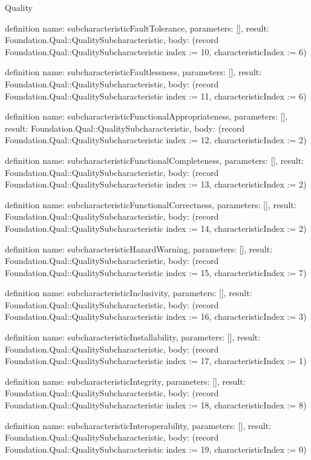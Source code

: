 \begin{lexlean}{Quality}
\begin{semanticmodule}
definition{
  name: subcharacteristicFaultTolerance,
  parameters: [],
  result: Foundation.Qual::QualitySubcharacteristic,
  body: (record Foundation.Qual::QualitySubcharacteristic {index := 10, characteristicIndex := 6})
}

definition{
  name: subcharacteristicFaultlessness,
  parameters: [],
  result: Foundation.Qual::QualitySubcharacteristic,
  body: (record Foundation.Qual::QualitySubcharacteristic {index := 11, characteristicIndex := 6})
}

definition{
  name: subcharacteristicFunctionalAppropriateness,
  parameters: [],
  result: Foundation.Qual::QualitySubcharacteristic,
  body: (record Foundation.Qual::QualitySubcharacteristic {index := 12, characteristicIndex := 2})
}

definition{
  name: subcharacteristicFunctionalCompleteness,
  parameters: [],
  result: Foundation.Qual::QualitySubcharacteristic,
  body: (record Foundation.Qual::QualitySubcharacteristic {index := 13, characteristicIndex := 2})
}

definition{
  name: subcharacteristicFunctionalCorrectness,
  parameters: [],
  result: Foundation.Qual::QualitySubcharacteristic,
  body: (record Foundation.Qual::QualitySubcharacteristic {index := 14, characteristicIndex := 2})
}

definition{
  name: subcharacteristicHazardWarning,
  parameters: [],
  result: Foundation.Qual::QualitySubcharacteristic,
  body: (record Foundation.Qual::QualitySubcharacteristic {index := 15, characteristicIndex := 7})
}

definition{
  name: subcharacteristicInclusivity,
  parameters: [],
  result: Foundation.Qual::QualitySubcharacteristic,
  body: (record Foundation.Qual::QualitySubcharacteristic {index := 16, characteristicIndex := 3})
}

definition{
  name: subcharacteristicInstallability,
  parameters: [],
  result: Foundation.Qual::QualitySubcharacteristic,
  body: (record Foundation.Qual::QualitySubcharacteristic {index := 17, characteristicIndex := 1})
}

definition{
  name: subcharacteristicIntegrity,
  parameters: [],
  result: Foundation.Qual::QualitySubcharacteristic,
  body: (record Foundation.Qual::QualitySubcharacteristic {index := 18, characteristicIndex := 8})
}

definition{
  name: subcharacteristicInteroperability,
  parameters: [],
  result: Foundation.Qual::QualitySubcharacteristic,
  body: (record Foundation.Qual::QualitySubcharacteristic {index := 19, characteristicIndex := 0})
}


\end{semanticmodule}
\end{lexlean}
